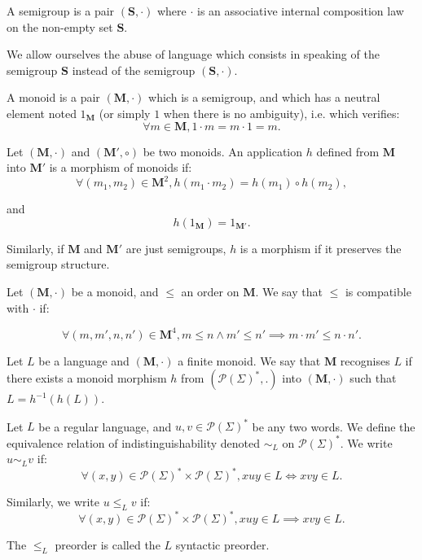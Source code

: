 \documentclass[a4paper,UKenglish,cleveref, autoref, thm-restate]{lipics-v2021}
\renewcommand{\alph}{\part(\Sigma)}
\newcommand{\op}{\cdot}
\renewcommand{\part}{\mathcal{P}}
\newcommand{\M}{\mathbf{M}}
\begin{document}
\begin{definition}
    A semigroup is a pair $(\mathbf{S}, \op)$ where $\op$ is an associative internal composition law on the non-empty set $\mathbf{S}$.
\end{definition}

\begin{remark}
    We allow ourselves the abuse of language which consists in speaking of the semigroup $\mathbf{S}$ instead of the semigroup $(\mathbf{S}, \op)$.
\end{remark}

\begin{definition}
    A monoid is a pair $(\M, \op)$ which is a semigroup, and which has a neutral element noted $1_{\M}$ (or simply $1$ when there is no ambiguity), i.e. which verifies:
    $$
    \forall m \in \M, 1 \op m = m \op 1 = m.
    $$
\end{definition}


\begin{definition}
    Let $(\M, \op)$ and $(\M', \circ)$ be two monoids. An application $h$ defined from $\M$ into $\M'$ is a morphism of monoids if:
    $$
    \forall (m_1,m_2) \in \M^2, h(m_1 \op m_2) = h(m_1) \circ h(m_2),
    $$
    
    and
    $$
    h(1_{\M}) = 1_{\M'}.
    $$

    Similarly, if $\M$ and $\M'$ are just semigroups, $h$ is a morphism if it preserves the semigroup structure.
    
\end{definition}


\begin{definition}
    Let $(\M,\op)$ be a monoid, and $\leq$ an order on $\M$. We say that $\leq$ is compatible with $\op$ if:

    $$
    \forall (m,m',n,n') \in \M^4, m \leq n \land m' \leq n' \implies m \op m' \leq n \op n'.
    $$
\end{definition}



\begin{definition}
    Let $L$ be a language and $(\M, \op)$ a finite monoid. We say that $\M$ recognises $L$ if there exists a monoid morphism $h$ from $(\alph^*,.)$ into $(\M, \op)$ such that $L = h^{-1}(h(L))$.
\end{definition}

\begin{definition}
    Let $L$ be a regular language, and $u,v\in\alph^*$ be any two words. We define the equivalence relation of indistinguishability denoted $\sim_L$ on $\alph^*$. We write $u \sim_L v$ if:
    $$
    \forall (x,y) \in \alph^* \times \alph^*, xuy \in L \iff xvy \in L.
    $$

    Similarly, we write $u \leq_L v$ if:
    $$
    \forall (x,y) \in \alph^* \times \alph^*, xuy \in L \implies xvy \in L.
    $$

    The $\leq_L$ preorder is called the $L$ syntactic preorder.
\end{definition}
\end{document}
